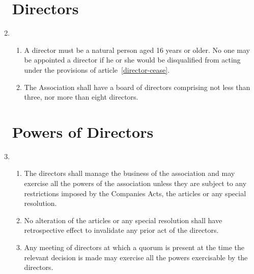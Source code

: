 \begin{enumerate}
\section{Directors}

\item
  \begin{enumerate}
  \item
    A director must be a natural person aged 16 years or older.
    No one may be appointed a director if he or she would be
    disqualified from acting under the provisions of
    article~\ref{director-cease}.
  \item
    The Association shall have a board of directors comprising not less than three,
    nor more than eight directors.
  \end{enumerate}

\section{Powers of Directors}

\item
  \begin{enumerate}
  \item
    The directors shall manage the business of the association and may
    exercise all the powers of the association unless they are subject to
    any restrictions imposed by the Companies Acts, the articles or any
    special resolution.
  \item
    No alteration of the articles or any special resolution shall have
    retrospective effect to invalidate any prior act of the directors.
  \item
    Any meeting of directors at which a quorum is present at the time
    the relevant decision is made may exercise all the powers
    exercisable by the directors.
  \end{enumerate}


\end{enumerate}
